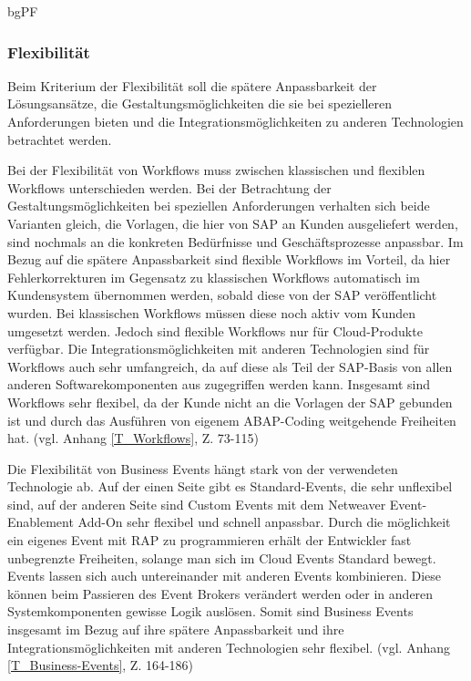 bgPF

\subsubsection{Flexibilität}

Beim Kriterium der Flexibilität soll die spätere Anpassbarkeit der Lösungsansätze, die Gestaltungsmöglichkeiten die sie bei spezielleren Anforderungen bieten und die Integrationsmöglichkeiten zu anderen Technologien betrachtet werden.

Bei der Flexibilität von Workflows muss zwischen klassischen und flexiblen Workflows unterschieden werden. Bei der Betrachtung der  Gestaltungsmöglichkeiten bei speziellen Anforderungen verhalten sich beide Varianten gleich, die Vorlagen, die hier von SAP an Kunden ausgeliefert werden, sind nochmals an die konkreten Bedürfnisse und Geschäftsprozesse anpassbar. Im Bezug auf die spätere Anpassbarkeit sind flexible Workflows im Vorteil, da hier Fehlerkorrekturen im Gegensatz zu klassischen Workflows automatisch im Kundensystem übernommen werden, sobald diese von der SAP veröffentlicht wurden. Bei klassischen Workflows müssen diese noch aktiv vom Kunden umgesetzt werden. Jedoch sind flexible Workflows nur für Cloud-Produkte verfügbar. Die Integrationsmöglichkeiten mit anderen Technologien sind für Workflows auch sehr umfangreich, da auf diese als Teil der SAP-Basis von allen anderen Softwarekomponenten aus zugegriffen werden kann. Insgesamt sind Workflows sehr flexibel, da der Kunde nicht an die Vorlagen der SAP gebunden ist und durch das Ausführen von eigenem ABAP-Coding weitgehende Freiheiten hat. (vgl. Anhang \ref{T_Workflows}, Z. 73-115)

Die Flexibilität von Business Events hängt stark von der verwendeten Technologie ab. Auf der einen Seite gibt es Standard-Events, die sehr unflexibel sind, auf der anderen Seite sind Custom Events mit dem Netweaver Event-Enablement Add-On sehr flexibel und schnell anpassbar. Durch die möglichkeit ein eigenes Event mit RAP zu programmieren erhält der Entwickler fast unbegrenzte Freiheiten, solange man sich im Cloud Events Standard bewegt. Events lassen sich auch untereinander mit anderen Events kombinieren. Diese können \zB beim Passieren des Event Brokers verändert werden oder in anderen Systemkomponenten gewisse Logik auslösen. Somit sind Business Events insgesamt im Bezug auf ihre spätere Anpassbarkeit und ihre Integrationsmöglichkeiten mit anderen Technologien sehr flexibel. (vgl. Anhang \ref{T_Business-Events}, Z. 164-186)

